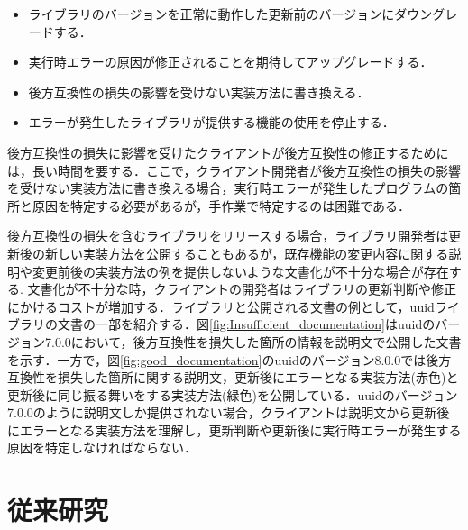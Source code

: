 \documentclass[11pt]{jreport}
\begin{document}
\begin{itemize}
\item ライブラリのバージョンを正常に動作した更新前のバージョンにダウングレードする．
\item 実行時エラーの原因が修正されることを期待してアップグレードする．
\item 後方互換性の損失の影響を受けない実装方法に書き換える．
\item エラーが発生したライブラリが提供する機能の使用を停止する．
\end{itemize}

後方互換性の損失に影響を受けたクライアントが後方互換性の修正するためには，長い時間を要する\cite{DependedOnYou}．ここで，クライアント開発者が後方互換性の損失の影響を受けない実装方法に書き換える場合，実行時エラーが発生したプログラムの箇所と原因を特定する必要があるが，手作業で特定するのは困難である\cite{Nielsen2021JSFix}\cite{10.1145/3428255}．

後方互換性の損失を含むライブラリをリリースする場合，ライブラリ開発者は更新後の新しい実装方法を公開することもあるが，既存機能の変更内容に関する説明や変更前後の実装方法の例を提供しないような文書化が不十分な場合が存在する.
文書化が不十分な時，クライアントの開発者はライブラリの更新判断や修正にかけるコストが増加する\cite{mostafa2017experience}．ライブラリと公開される文書の例として，uuidライブラリの文書の一部を紹介する．図\ref{fig:Insufficient_documentation}はuuidのバージョン7.0.0において，後方互換性を損失した箇所の情報を説明文で公開した文書を示す．一方で，図\ref{fig:good_documentation}のuuidのバージョン8.0.0では後方互換性を損失した箇所に関する説明文，更新後にエラーとなる実装方法(赤色)と更新後に同じ振る舞いをする実装方法(緑色)を公開している．uuidのバージョン7.0.0のように説明文しか提供されない場合，クライアントは説明文から更新後にエラーとなる実装方法を理解し，更新判断や更新後に実行時エラーが発生する原因を特定しなければならない．


\section{従来研究}
\end{document}
